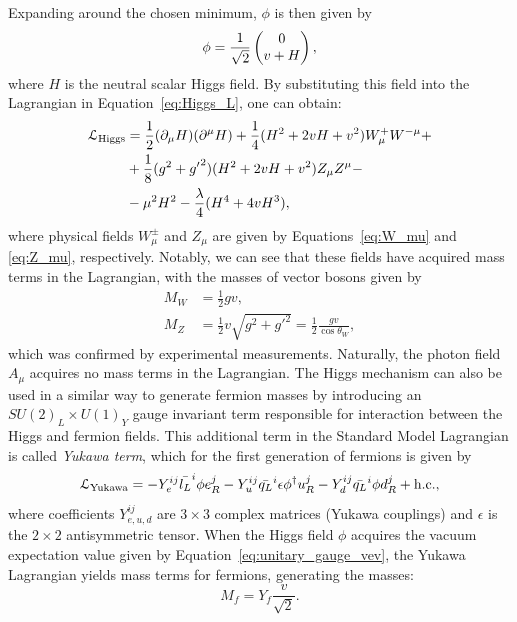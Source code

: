 Expanding around the chosen minimum, $\phi$ is then given by
\begin{equation}
\phi = \frac{1}{\sqrt{2}} \begin{pmatrix} 0 \\ v+H \end{pmatrix},
\end{equation}
where $H$ is the neutral scalar Higgs field. By substituting this field into the Lagrangian in
Equation~\ref{eq:Higgs_L}, one can obtain:
\begin{equation}
\begin{split}
\mathcal{L}_\textrm{Higgs} & = \frac{1}{2} (\partial_\mu H)(\partial^\mu H) + \frac{1}{4} (H^2 + 2vH + v^2) W^+_\mu W^{-\mu} + \\
& + \frac{1}{8} (g^2 + {g'}^2)(H^2 + 2vH + v^2)Z_\mu Z^\mu - \\
& - \mu^2 H^2 - \frac{\lambda}{4} (H^4 + 4vH^3),
\end{split}
\label{eq:Higgs_L_final}
\end{equation}
where physical fields $W^{\pm}_\mu$ and $Z_\mu$ are given by Equations~\ref{eq:W_mu} and \ref{eq:Z_mu}, respectively.
Notably, we can see that these fields have acquired mass terms in the Lagrangian, with the masses of vector bosons given
by
\begin{subequations}
\begin{align}
M_W &= \frac{1}{2}gv, \\
M_Z &= \frac{1}{2}v\sqrt{g^2+{g'}^2} = \frac{1}{2} \frac{gv}{\cos{\theta_W}},
\end{align}
\end{subequations}
which was confirmed by experimental measurements. Naturally, the photon field $A_\mu$ acquires no mass terms in the
Lagrangian. The Higgs mechanism can also be used in a similar way to generate fermion masses by introducing an $SU(2)_L
\times U(1)_Y$ gauge invariant term responsible for interaction between the Higgs and fermion fields. This additional
term in the Standard Model Lagrangian is called \textit{Yukawa term}, which for the first generation of fermions is
given by
\begin{equation}
\mathcal{L}_\textrm{Yukawa} = -Y_e^{ij} \bar{l_L}^i \phi e_R^j - Y_u^{ij} \bar{q_L}^i \epsilon \phi^\dag u_R^j - Y_d^{ij}
\bar{q_L}^i \phi d_R^j + \textrm{h.c.},
\end{equation}
where coefficients $Y_{e,u,d}^{ij}$ are $3\times3$ complex matrices (Yukawa couplings) and $\epsilon$ is the $2\times2$
antisymmetric tensor. When the Higgs field $\phi$ acquires the vacuum expectation value given by
Equation~\ref{eq:unitary_gauge_vev}, the Yukawa Lagrangian yields mass terms for fermions, generating the masses:
\begin{equation}
M_f = Y_f \frac{v}{\sqrt{2}}.
\end{equation}

